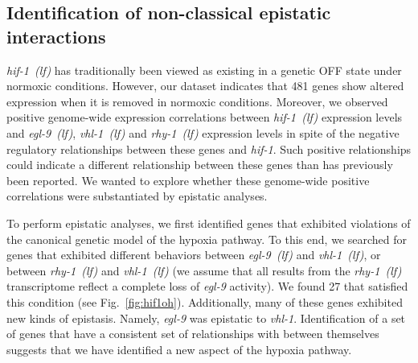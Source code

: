 \documentclass[9pt,twocolumn,twoside]{pnas-new}
\newcommand{\gene}[1]{\emph{#1}}
\newcommand{\egl}{\emph{egl-9~(lf)}}
\newcommand{\rhy}{\emph{rhy-1~(lf)}}
\newcommand{\vhl}{\emph{vhl-1~(lf)}}
\newcommand{\hif}{\emph{hif-1~(lf)}}
\newcommand{\hifn}{481}
\newcommand{\hifohtargets}{27}
\begin{document}
\subsection{Identification of non-classical epistatic interactions}
\label{sub:hifoh}
\hif{} has traditionally been viewed as existing in a genetic OFF state under
normoxic conditions. However, our dataset indicates that \hifn{} genes show
altered expression when it is removed in normoxic conditions. Moreover, we
observed positive genome-wide expression correlations between \hif{} expression
levels and \egl{}, \vhl{} and \rhy{} expression levels in spite of the negative
regulatory relationships between these genes and \gene{hif-1}. Such positive
relationships could indicate a different relationship between these genes
than has previously been reported. We wanted to explore whether these genome-wide
positive correlations were substantiated by epistatic analyses.

To perform epistatic analyses, we first identified genes that exhibited violations
of the canonical genetic model of the hypoxia pathway. To this end, we searched for
genes that exhibited different behaviors between \egl{} and \vhl{}, or
between \rhy{} and \vhl{} (we assume that all results from the
\rhy{} transcriptome reflect a complete loss of \gene{egl-9} activity). We found
\hifohtargets{} that satisfied this condition (see Fig.~\ref{fig:hif1oh}).
Additionally, many of these genes exhibited new kinds of epistasis. Namely,
\gene{egl-9} was epistatic to \gene{vhl-1}. Identification of a set of genes
that have a consistent set of relationships with between themselves suggests that
we have identified a new aspect of the hypoxia pathway.
\end{document}

